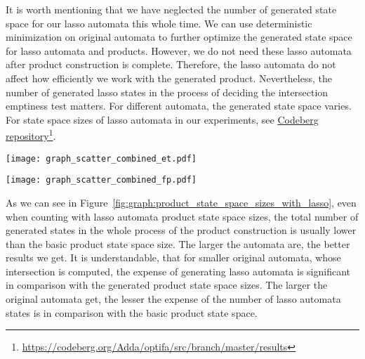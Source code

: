 It is worth mentioning that we have neglected the number of generated state space for our lasso automata this whole time. We can use deterministic minimization on original automata to further optimize the generated state space for lasso automata and products. However, we do not need these lasso automata after product construction is complete. Therefore, the lasso automata do not affect how efficiently we work with the generated product. Nevertheless, the number of generated lasso states in the process of deciding the intersection emptiness test matters. For different automata, the generated state space varies. For state space sizes of lasso automata in our experiments, see \href{https://codeberg.org/Adda/optifa/src/branch/master/results}{Codeberg repository}\footnote{{\href{https://codeberg.org/Adda/optifa/src/branch/master/results}{https://codeberg.org/Adda/optifa/src/branch/master/results}}}.

\begin{figure*}[ht]
    \centering
    \begin{minipage}{0.49\linewidth}
        \centering
        \texttt{[image: graph\_scatter\_combined\_et.pdf]}
        \caption{Emptiness test}
        \label{fig:graph:et_state_space_sizes_comp_with_lasso}
    \end{minipage}
    \hfill
    \begin{minipage}{0.49\linewidth}
        \centering
        \texttt{[image: graph\_scatter\_combined\_fp.pdf]}
        \caption{Full product construction}
        \label{fig:graph:fp_state_space_sizes_comp_with_lasso}
    \end{minipage}
    \vspace{0.5cm}
    \caption{Comparison of state space sizes generated by basic and optimized product construction algorithms with sum of states generated for both the final optimized product and lasso automata states generated in the process of the product construction. Both axes are in logarithmic scale, x-axis showing state space sizes of basic product, y-axis state space sizes of optimized product (and optimized product with lasso automata states). The blue dots represent only the optimized product state space sizes (as in Figure~\ref{fig:graph:product_state_space_sizes}), the orange dots the sum of optimized product state space sizes and the generated lasso states.}
    \label{fig:graph:product_state_space_sizes_with_lasso}
\end{figure*}

As we can see in Figure~\ref{fig:graph:product_state_space_sizes_with_lasso}, even when counting with lasso automata product state space sizes, the total number of generated states in the whole process of the product construction is usually lower than the basic product state space size. The larger the automata are, the better results we get. It is understandable, that for smaller original automata, whose intersection is computed, the expense of generating lasso automata is significant in comparison with the generated product state space sizes. The larger the original automata get, the lesser the expense of the number of lasso automata states is in comparison with the basic product state space.

